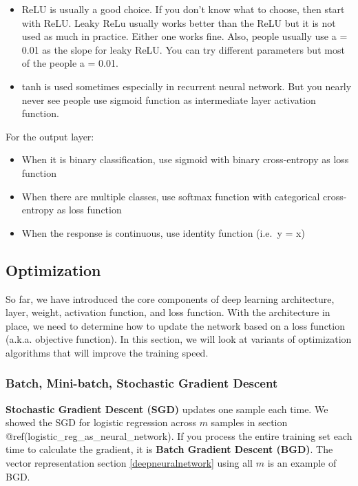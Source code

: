 \documentclass[12pt,]{krantz}
\providecommand{\tightlist}{%
  \setlength{\itemsep}{0pt}\setlength{\parskip}{0pt}}
\begin{document}
\begin{itemize}
\tightlist
\item
  ReLU is usually a good choice. If you don't know what to choose, then start with ReLU. Leaky ReLu usually works better than the ReLU but it is not used as much in practice. Either one works fine. Also, people usually use a = 0.01 as the slope for leaky ReLU. You can try different parameters but most of the people a = 0.01.
\item
  tanh is used sometimes especially in recurrent neural network. But you nearly never see people use sigmoid function as intermediate layer activation function.
\end{itemize}

For the output layer:

\begin{itemize}
\tightlist
\item
  When it is binary classification, use sigmoid with binary cross-entropy as loss function
\item
  When there are multiple classes, use softmax function with categorical cross-entropy as loss function
\item
  When the response is continuous, use identity function (i.e.~y = x)
\end{itemize}

\hypertarget{optimization}{%
\subsection{Optimization}\label{optimization}}

So far, we have introduced the core components of deep learning architecture, layer, weight, activation function, and loss function. With the architecture in place, we need to determine how to update the network based on a loss function (a.k.a. objective function). In this section, we will look at variants of optimization algorithms that will improve the training speed.

\hypertarget{batch-mini-batch-stochastic-gradient-descent}{%
\subsubsection{Batch, Mini-batch, Stochastic Gradient Descent}\label{batch-mini-batch-stochastic-gradient-descent}}

\textbf{Stochastic Gradient Descent (SGD)} updates one sample each time. We showed the SGD for logistic regression across \(m\) samples in section @ref(logistic\_reg\_as\_neural\_network). If you process the entire training set each time to calculate the gradient, it is \textbf{Batch Gradient Descent (BGD)}. The vector representation section \ref{deepneuralnetwork} using all \(m\) is an example of BGD.
\end{document}
